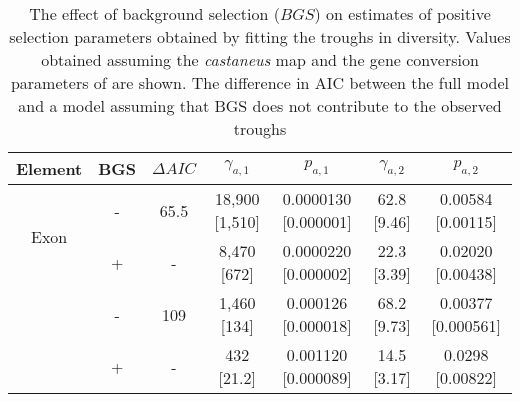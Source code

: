 
\begin{table}[H]
   \centering
\begin{adjustbox}{max width=\textwidth}
   \begin{threeparttable}[b]
\caption{The effect of background selection ($BGS$) on estimates of positive selection parameters obtained by fitting the troughs in diversity. Values obtained assuming the \textit{castaneus} map and the gene conversion parameters of \cite{RN263} are shown. The difference in AIC between the full model and a model assuming that BGS does not contribute to the observed troughs }


\begin{tabular}{ccccccc}
\toprule
       Element & BGS & $\Delta AIC$ &  $\gamma_{a,1}$ &      $p_{a,1}$ &       $\gamma_{a,2}$ &      $p_{a,2}$  \\
\midrule
\multirow{2}{*}{Exon}    & - &  65.5 & 18,900 [1,510]   &  0.0000130 [0.000001] &  62.8 [9.46] &  0.00584 [0.00115] \\
 					    & + & -    &  8,470  [672]   &  0.0000220 [0.000002] &  22.3 [3.39] &  0.02020   [0.00438] \\ \hdashline
 \multirow{2}{*}{CNE}   & - &   109 &   1,460 [134]   &  0.000126 [0.000018] &  68.2  [9.73] &  0.00377 [0.000561] \\
                        & + & -    &    432  [21.2] &  0.001120 [0.000089] &  14.5 [3.17] &  0.0298   [0.00822] \\
\bottomrule
\end{tabular}
  \label{tab:BGSeffect}

\end{threeparttable}
\end{adjustbox}

\end{table}